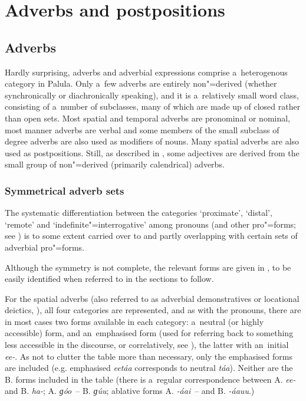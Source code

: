 \chapter{Adverbs and postpositions}
\label{chap:7}

\section{Adverbs}
\label{sec:7-1}


Hardly surprising, adverbs and adverbial expressions comprise a~heterogenous category in Palula. Only a~few adverbs are entirely non"=derived (whether synchronically or diachronically speaking), and it is a~relatively small word class, consisting of a~number of subclasses, many of which are made up of closed rather than open sets. Most spatial and temporal adverbs are pronominal or nominal, most manner adverbs are verbal and some members of the small subclass of degree adverbs are also used as modifiers of nouns. Many spatial adverbs are also used as postpositions. Still, as described in , some adjectives are derived from the small group of non"=derived (primarily calendrical) adverbs.


\subsection{Symmetrical adverb sets}
\label{subsec:7-1-1}

The systematic differentiation between the categories `proximate', `distal', `remote' and `indefinite"=interrogative' among pronouns (and other pro"=forms; see ) is to some extent carried over to and partly overlapping with certain sets of adverbial pro"=forms. 



Although the symmetry is not complete, the relevant forms are given in , to be easily identified when referred to in the sections to follow.



For the spatial adverbs (also referred to as adverbial demonstratives or locational deictics, \citealt[431]{diessel2006}), all four categories are represented, and as with the pronouns, there are in most cases two forms available in each category: a~neutral (or highly accessible) form, and an~emphasised form (used for referring back to something less accessible in the discourse, or correlatively, see ), the latter with an~initial \textit{ee-}. As not to clutter the table more than necessary, only the emphasised forms are included (e.g. emphasised \textit{eetáa} corresponds to neutral \textit{táa}). Neither are the B. forms included in the table (there is a~regular correspondence between A. \textit{ee-} and B. \textit{ha-}; A. \textit{ɡóo}~-- B. \textit{ɡúu}; ablative forms A. \textit{-áai}~-- and B. \textit{-áauu}.)



